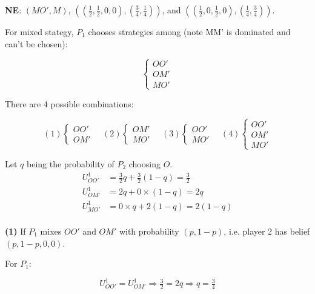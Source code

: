 \documentclass{article}
\begin{document}
\medskip

\textbf{NE}: $(MO', M)$, $\left( \left( \tfrac12, \tfrac12, 0, 0 \right), \left( \tfrac34, \tfrac14 \right) \right)$, and $\left( \left( \tfrac12, 0, \tfrac12, 0 \right), \left( \tfrac14, \tfrac34 \right) \right)$. 

\medskip

For mixed stategy, $P_1$ chooses strategies among (note MM' is dominated and can't be chosen):

\begin{equation}
    \begin{cases}
OO' \\ OM' \\ MO'
    \end{cases}
\nonumber
\end{equation}

There are 4 possible combinations:

\begin{equation}
(1)
    \begin{cases}
OO' \\ OM'
    \end{cases}
\quad (2)
    \begin{cases}
 OM' \\ MO'
    \end{cases}
 \quad (3) 
    \begin{cases}
OO'  \\ MO'
    \end{cases}
 \quad (4) 
    \begin{cases}
OO' \\ OM' \\ MO'
    \end{cases}
\nonumber
\end{equation}

Let $q$ being the probability of $P_2$ choosing $O$.
\begin{align*}
U^1_{OO'} &= \tfrac32 q + \tfrac32 (1-q) = \tfrac32 \\
U^1_{OM'} &= 2 q + 0 \times (1-q) = 2q \\
U^1_{MO'} &= 0 \times q +  2 (1-q) = 2 (1-q) \\
\end{align*}


\medskip

\textbf{(1)} If $P_1$ mixes $OO'$ and $OM'$ with probability $(p,1-p)$, i.e. player 2 has belief $(p,1-p,0,0)$.
\medskip

For $P_1$:

$$U^1_{OO'} = U^1_{OM'} \Rightarrow \tfrac32 = 2q  \Rightarrow  q =\tfrac34$$
\end{document}

